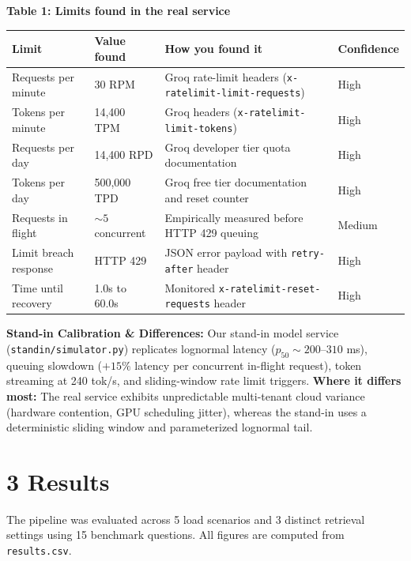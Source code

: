 \documentclass[10pt,a4paper]{article}
\begin{document}
\textbf{Table 1: Limits found in the real service}
\begin{center}
\footnotesize
\begin{tabularx}{\textwidth}{p{3.2cm}p{2.5cm}Xp{2.0cm}}
\toprule
\textbf{Limit} & \textbf{Value found} & \textbf{How you found it} & \textbf{Confidence} \\
\midrule
Requests per minute & 30 RPM & Groq rate-limit headers (\texttt{x-ratelimit-limit-requests}) & High \\
Tokens per minute & 14,400 TPM & Groq headers (\texttt{x-ratelimit-limit-tokens}) & High \\
Requests per day & 14,400 RPD & Groq developer tier quota documentation & High \\
Tokens per day & 500,000 TPD & Groq free tier documentation and reset counter & High \\
Requests in flight & $\sim 5$ concurrent & Empirically measured before HTTP 429 queuing & Medium \\
Limit breach response & HTTP 429 & JSON error payload with \texttt{retry-after} header & High \\
Time until recovery & 1.0s to 60.0s & Monitored \texttt{x-ratelimit-reset-requests} header & High \\
\bottomrule
\end{tabularx}
\end{center}

\textbf{Stand-in Calibration \& Differences:} Our stand-in model service (\texttt{standin/simulator.py}) replicates lognormal latency ($p_{50} \sim 200$--$310$ ms), queuing slowdown ($+15\%$ latency per concurrent in-flight request), token streaming at 240 tok/s, and sliding-window rate limit triggers. \textbf{Where it differs most:} The real service exhibits unpredictable multi-tenant cloud variance (hardware contention, GPU scheduling jitter), whereas the stand-in uses a deterministic sliding window and parameterized lognormal tail.

\section*{3 Results}

The pipeline was evaluated across 5 load scenarios and 3 distinct retrieval settings using 15 benchmark questions. All figures are computed from \texttt{results.csv}.
\end{document}
